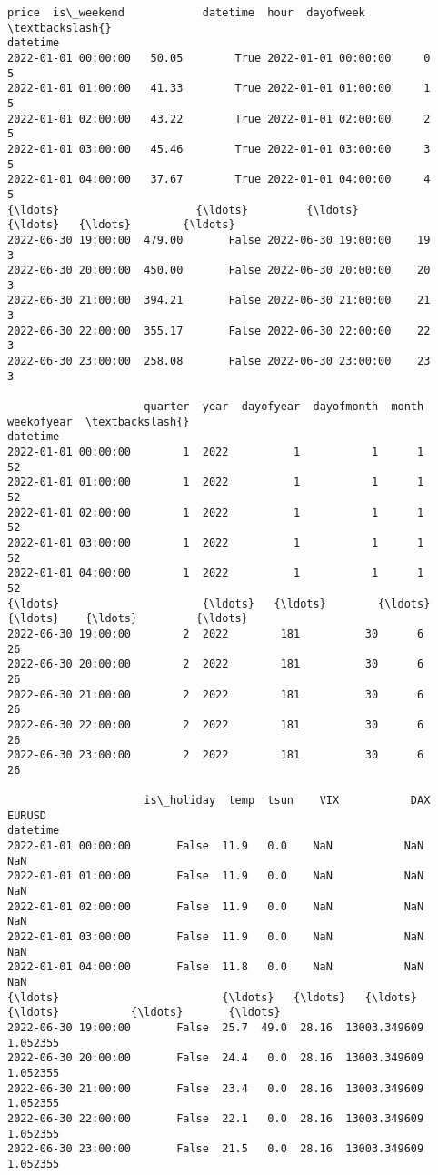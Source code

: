 \documentclass[11pt]{article}
\makeatletter
\newcommand{\boxspacing}{\kern\kvtcb@left@rule\kern\kvtcb@boxsep}
\newcommand{\prompt}[4]{
        {\ttfamily\llap{{\color{#2}[#3]:\hspace{3pt}#4}}\vspace{-\baselineskip}}
    }
\makeatother
\begin{document}
            \begin{tcolorbox}[breakable, size=fbox, boxrule=.5pt, pad at break*=1mm, opacityfill=0]
\prompt{Out}{outcolor}{27}{\boxspacing}
\begin{Verbatim}[commandchars=\\\{\}]
                      price  is\_weekend            datetime  hour  dayofweek  \textbackslash{}
datetime
2022-01-01 00:00:00   50.05        True 2022-01-01 00:00:00     0          5
2022-01-01 01:00:00   41.33        True 2022-01-01 01:00:00     1          5
2022-01-01 02:00:00   43.22        True 2022-01-01 02:00:00     2          5
2022-01-01 03:00:00   45.46        True 2022-01-01 03:00:00     3          5
2022-01-01 04:00:00   37.67        True 2022-01-01 04:00:00     4          5
{\ldots}                     {\ldots}         {\ldots}                 {\ldots}   {\ldots}        {\ldots}
2022-06-30 19:00:00  479.00       False 2022-06-30 19:00:00    19          3
2022-06-30 20:00:00  450.00       False 2022-06-30 20:00:00    20          3
2022-06-30 21:00:00  394.21       False 2022-06-30 21:00:00    21          3
2022-06-30 22:00:00  355.17       False 2022-06-30 22:00:00    22          3
2022-06-30 23:00:00  258.08       False 2022-06-30 23:00:00    23          3

                     quarter  year  dayofyear  dayofmonth  month  weekofyear  \textbackslash{}
datetime
2022-01-01 00:00:00        1  2022          1           1      1          52
2022-01-01 01:00:00        1  2022          1           1      1          52
2022-01-01 02:00:00        1  2022          1           1      1          52
2022-01-01 03:00:00        1  2022          1           1      1          52
2022-01-01 04:00:00        1  2022          1           1      1          52
{\ldots}                      {\ldots}   {\ldots}        {\ldots}         {\ldots}    {\ldots}         {\ldots}
2022-06-30 19:00:00        2  2022        181          30      6          26
2022-06-30 20:00:00        2  2022        181          30      6          26
2022-06-30 21:00:00        2  2022        181          30      6          26
2022-06-30 22:00:00        2  2022        181          30      6          26
2022-06-30 23:00:00        2  2022        181          30      6          26

                     is\_holiday  temp  tsun    VIX           DAX    EURUSD
datetime
2022-01-01 00:00:00       False  11.9   0.0    NaN           NaN       NaN
2022-01-01 01:00:00       False  11.9   0.0    NaN           NaN       NaN
2022-01-01 02:00:00       False  11.9   0.0    NaN           NaN       NaN
2022-01-01 03:00:00       False  11.9   0.0    NaN           NaN       NaN
2022-01-01 04:00:00       False  11.8   0.0    NaN           NaN       NaN
{\ldots}                         {\ldots}   {\ldots}   {\ldots}    {\ldots}           {\ldots}       {\ldots}
2022-06-30 19:00:00       False  25.7  49.0  28.16  13003.349609  1.052355
2022-06-30 20:00:00       False  24.4   0.0  28.16  13003.349609  1.052355
2022-06-30 21:00:00       False  23.4   0.0  28.16  13003.349609  1.052355
2022-06-30 22:00:00       False  22.1   0.0  28.16  13003.349609  1.052355
2022-06-30 23:00:00       False  21.5   0.0  28.16  13003.349609  1.052355


\end{Verbatim}
\end{tcolorbox}
\end{document}
